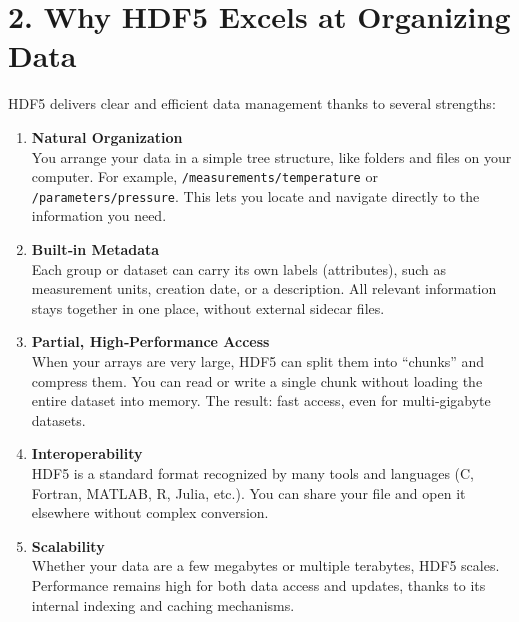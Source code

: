 \documentclass[a4paper,11pt]{article}
\begin{document}
\section*{2. Why HDF5 Excels at Organizing Data}

HDF5 delivers clear and efficient data management thanks to several strengths:

\begin{enumerate}
  \item \textbf{Natural Organization}\\
    You arrange your data in a simple tree structure, like folders and files on your computer.  
    For example, \texttt{/measurements/temperature} or \texttt{/parameters/pressure}.  
    This lets you locate and navigate directly to the information you need.

  \item \textbf{Built‐in Metadata}\\
    Each group or dataset can carry its own labels (attributes), such as measurement units, creation date, or a description.  
    All relevant information stays together in one place, without external sidecar files.

  \item \textbf{Partial, High‐Performance Access}\\
    When your arrays are very large, HDF5 can split them into “chunks” and compress them.  
    You can read or write a single chunk without loading the entire dataset into memory.  
    The result: fast access, even for multi‐gigabyte datasets.

  \item \textbf{Interoperability}\\
    HDF5 is a standard format recognized by many tools and languages (C, Fortran, MATLAB, R, Julia, etc.).  
    You can share your file and open it elsewhere without complex conversion.

  \item \textbf{Scalability}\\
    Whether your data are a few megabytes or multiple terabytes, HDF5 scales.  
    Performance remains high for both data access and updates, thanks to its internal indexing and caching mechanisms.
\end{enumerate}
\end{document}
